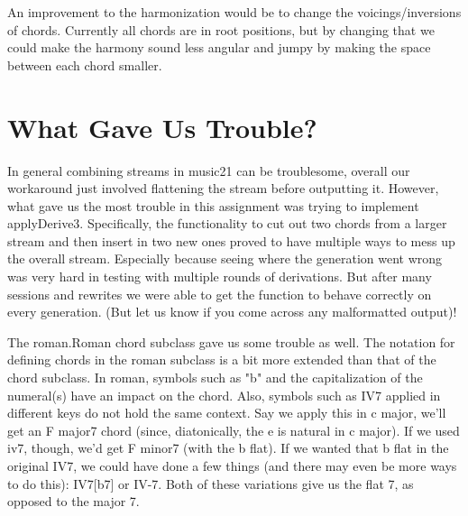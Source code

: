 \documentclass{article}
\begin{document}
An improvement to the harmonization would be to change the voicings/inversions of chords. Currently all chords are in root positions, but by changing that we could make the harmony sound less angular and jumpy by making the space between each chord smaller.

\section{What Gave Us Trouble?}

In general combining streams in music21 can be troublesome, overall our workaround just involved flattening the stream before outputting it.
However, what gave us the most trouble in this assignment was trying to implement applyDerive3. Specifically, the functionality to cut out two chords from a larger stream and then insert in two new ones proved to have multiple ways to mess up the overall stream. Especially because seeing where the generation went wrong was very hard in testing with multiple rounds of derivations. But after many sessions and rewrites we were able to get the function to behave correctly on every generation. (But let us know if you come across any malformatted output)!

The roman.Roman chord subclass gave us some trouble as well. The notation for defining chords in the roman subclass is a bit more extended than that of the chord subclass. In roman, symbols such as "b" and the capitalization of the numeral(s) have an impact on the chord. Also, symbols such as IV7 applied in different keys do not hold the same context. Say we apply this in c major, we'll get an F major7 chord (since, diatonically, the e is natural in c major). If we used iv7, though, we'd get F minor7 (with the b flat). If we wanted that b flat in the original IV7, we could have done a few things (and there may even be more ways to do this): IV7[b7] or IV-7. Both of these variations give us the flat 7, as opposed to the major 7.
\end{document}
